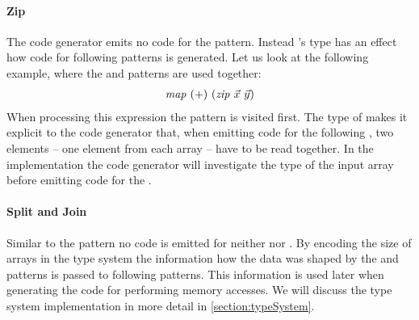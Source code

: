 \paragraph{Zip}
The code generator emits no \OpenCL code for the \zip pattern.
Instead \zip's type has an effect how code for following patterns is generated.
Let us look at the following example, where the \zip and \mapGlobal patterns are used together:
\begin{align}
  \text{\textit{map}}\ (+)\ (\text{\textit{zip}}\ \vec{x}\ \vec{y})
\end{align}
When processing this expression the \zip pattern is visited first.
The type of \zip makes it explicit to the code generator that, when emitting code for the following \mapGlobal, two elements -- one element from each array -- have to be read together.
In the implementation the code generator will investigate the type of the input array before emitting code for the \mapGlobal.

\paragraph{Split and Join}
Similar to the \zip pattern no \OpenCL code is emitted for neither \splitN nor \join.
By encoding the size of arrays in the type system the information how the data was shaped by the \splitN and \join patterns is passed to following patterns.
This information is used later when generating the \OpenCL code for performing \OpenCL memory accesses. 
We will discuss the type system implementation in more detail in \autoref{section:typeSystem}.


